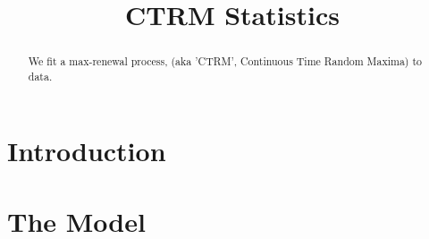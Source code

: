 \documentclass[12pt]{amsart}
\author{ }
\theoremstyle{definition}
\theoremstyle{remark}
\numberwithin{equation}{section}
\newcommand{\1}{\mathbf 1}
\begin{document}

\title{CTRM Statistics}









\begin{abstract}
We fit a max-renewal process, (aka 'CTRM', Continuous Time Random Maxima)
to data. 
\end{abstract}
\maketitle




\section{Introduction}


\section{The Model}
\end{document}
